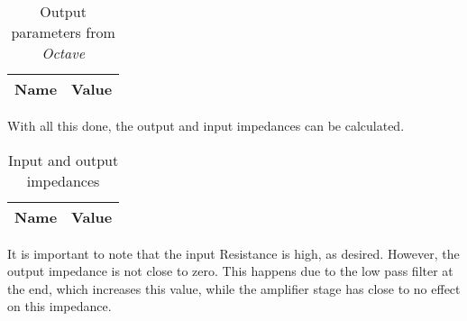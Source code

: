 \begin{table}[H]
  \centering
  \begin{tabular}{|l|r|}
    \hline    
    {\bf Name} & {\bf Value} \\ \hline
    
  \end{tabular}
  \caption{Output parameters from {\it Octave} }
  \label{tab:OutputParam}
\end{table}

With all this done, the output and input impedances can be calculated.

\begin{table}[H]
  \centering
  \begin{tabular}{|l|r|}
    \hline    
    {\bf Name} & {\bf Value} \\ \hline
    
  \end{tabular}
  \caption{Input and output impedances}
  \label{tab:ImpOC}
\end{table}

It is important to note that the input Resistance is high, as desired. However, the output impedance is not close to zero. This happens due to the low pass filter at the end, which increases this value, while the amplifier stage has close to no effect on this impedance.
